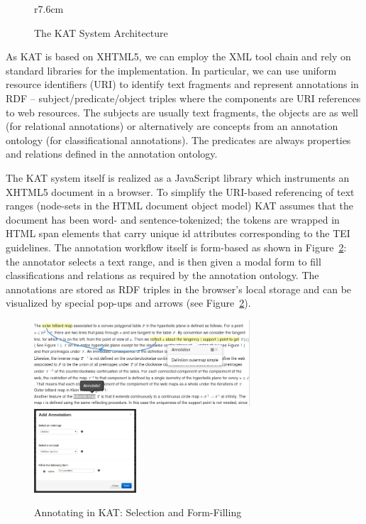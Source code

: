 \documentclass{llncs}
\def\KAT{\textsf{KAT}\xspace}
\begin{document}
\begin{figure}r{7.6cm}\vspace*{-2em}
\def\localxscale{.85}\def\localyscale{1.35}
\caption{The \KAT System Architecture}\label{fig:kat-arch}\vspace*{-1em}
\end{figure}
As \KAT is based on XHTML5, we can employ the XML tool chain and rely on standard libraries
for the implementation. In particular, we can use uniform resource identifiers (URI) to identify text
fragments and represent annotations in RDF -- subject/predicate/object triples where the
components are URI references to web resources. The subjects are usually text fragments,
the objects are as well (for relational annotations) or alternatively are concepts from an annotation ontology (for
classificational annotations). The predicates are always properties and relations defined in the annotation ontology.

The \KAT system itself is realized as a JavaScript library which instruments an XHTML5
document in a browser. To simplify the URI-based referencing of text ranges (node-sets in
the HTML document object model) \KAT assumes that the document has been word- and sentence-tokenized;
the tokens are wrapped in HTML
\textsf{span} elements that carry unique \textsf{id} attributes corresponding to the TEI
guidelines. The annotation workflow itself is form-based as shown in
Figure~\ref{fig:kat-annotate}: the annotator selects a text range, and is then given a
modal form to fill classifications and relations as required by the annotation
ontology. The annotations are stored as RDF triples in the browser's local storage and can
be visualized by special pop-ups and arrows (see Figure~\ref{fig:kat-annotate}).

\begin{figure}[ht]\centering
  \includegraphics[height=3.2cm]{../PIC/annotate}\quad
  \includegraphics[height=3.1cm]{../PIC/add-symbol}
  \caption{Annotating in \KAT: Selection and Form-Filling}\label{fig:kat-annotate}
\end{figure}
\end{document}
